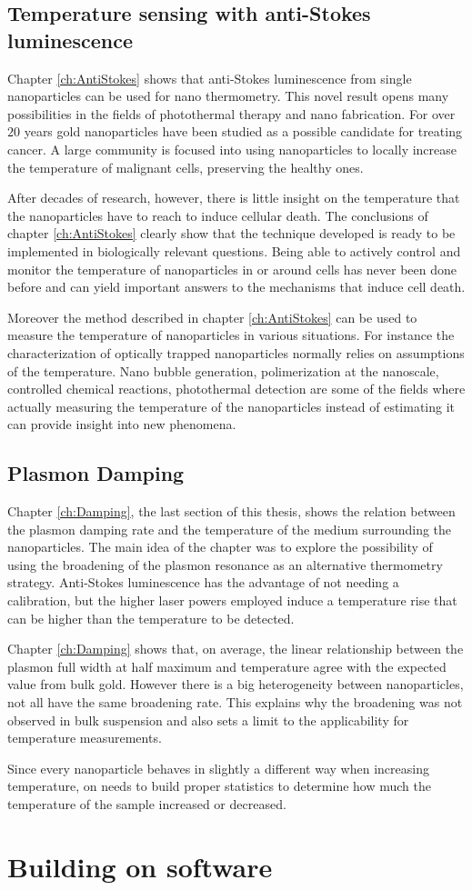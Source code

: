 \subsection{Temperature sensing with anti-Stokes luminescence}
Chapter \ref{ch:AntiStokes} shows that anti-Stokes luminescence from single
nanoparticles can be used for nano thermometry. This novel result opens many
possibilities in the fields of photothermal therapy and nano fabrication. For
over $20$ years gold nanoparticles have been studied as a possible candidate for
treating cancer. A large community is focused into using nanoparticles to
locally increase the temperature of malignant cells, preserving the healthy
ones.

After decades of research, however, there is little insight on the temperature
that the nanoparticles have to reach to induce cellular death. The conclusions
of chapter \ref{ch:AntiStokes} clearly show that the technique developed is
ready to be implemented in biologically relevant questions. Being able to
actively control and monitor the temperature of nanoparticles in or around cells
has never been done before and can yield important answers to the mechanisms
that induce cell death. 

Moreover the method described in chapter \ref{ch:AntiStokes} can be used to
measure the temperature of nanoparticles in various situations. For instance
the characterization of optically trapped nanoparticles normally relies on
assumptions of the temperature. Nano bubble generation, polimerization at the
nanoscale, controlled chemical reactions, photothermal detection are some of the
fields where actually measuring the temperature of the nanoparticles instead
of estimating it can provide insight into new phenomena. 

\subsection{Plasmon Damping}
Chapter \ref{ch:Damping}, the last section of this thesis, shows the relation
between the plasmon damping rate and the temperature of the medium surrounding
the nanoparticles. The main idea of the chapter was to explore the possibility
of using the broadening of the plasmon resonance as an alternative thermometry
strategy. Anti-Stokes luminescence has the advantage of not needing a
calibration, but the higher laser powers employed induce a temperature rise that
can be higher than the temperature to be detected.

Chapter \ref{ch:Damping} shows that, on average, the linear relationship between
the plasmon full width at half maximum and temperature agree with the expected
value from bulk gold. However there is a big heterogeneity between 
nanoparticles, not all have the same broadening rate. This explains why the
broadening was not observed in bulk suspension and also sets a limit to the
applicability for temperature measurements. 

Since every nanoparticle behaves in slightly a different way when increasing
temperature, on needs to build proper statistics to determine how much the
temperature of the sample increased or decreased. 


\section{Building on software}

